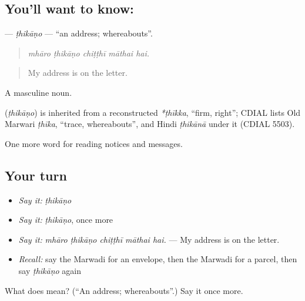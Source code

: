 \subsection*{You'll want to know: }
\textbf{} — \emph{ṭhikāṇo} — \textquotedblleft{}an address; whereabouts\textquotedblright{}.

\begin{quote}
    
\end{quote}

\begin{quote}
\emph{mhāro ṭhikāṇo chiṭṭhī māthai hai.}
\end{quote}

\begin{quote}
My address is on the letter.
\end{quote}

A masculine noun.

\begin{cousinweb}
\textbf{} (\emph{ṭhikāṇo}) is inherited from a reconstructed \emph{*ṭhīkka}, \textquotedblleft{}firm, right\textquotedblright{}; CDIAL lists Old Marwari \emph{ṭhīka}, \textquotedblleft{}trace, whereabouts\textquotedblright{}, and Hindi \emph{ṭhikānā} under it (CDIAL 5503).
\end{cousinweb}

\begin{grammarlens}[title={What you've built}]
One more word for reading notices and messages.
\end{grammarlens}

\subsection*{Your turn}
\begin{itemize}
\raggedright
  \item \emph{Say it:} \emph{ṭhikāṇo}
  \item \emph{Say it:} \emph{ṭhikāṇo}, once more
  \item \emph{Say it:} \emph{mhāro ṭhikāṇo chiṭṭhī māthai hai.} — My address is on the letter.
  \item \emph{Recall:} say the Marwadi for an envelope, then the Marwadi for a parcel, then say \emph{ṭhikāṇo} again
\end{itemize}

\begin{tcolorbox}[breakable,colback=teal!4,colframe=teal!35!black,title={Before you move on}]
What does  mean? (\textquotedblleft{}An address; whereabouts\textquotedblright{}.) Say it once more.
\end{tcolorbox}
